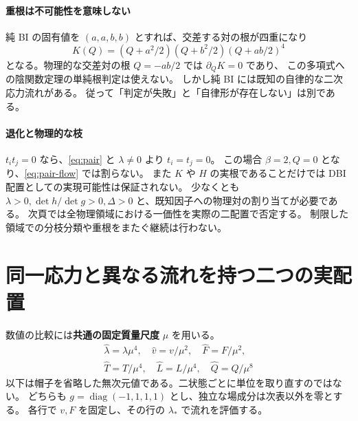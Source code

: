 \documentclass[11pt,a4paper]{article}
\begin{document}
\paragraph{重根は不可能性を意味しない}
純 BI の固有値を $(a,a,b,b)$ とすれば、交差する対の根が四重になり
\begin{equation}\label{eq:BI}
K(Q)=(Q+a^2/2)(Q+b^2/2)(Q+ab/2)^4
\end{equation}
となる。物理的な交差対の根 $Q=-ab/2$ では $\partial_QK=0$ であり、
この多項式への陰関数定理の単純根判定は使えない。
しかし純 BI には既知の自律的な二次応力流れがある。
従って「判定が失敗」と「自律形が存在しない」は別である。

\paragraph{退化と物理的な枝}
$t_it_j=0$ なら、\eqref{eq:pair} と $\lambda\ne0$ より $t_i=t_j=0$。
この場合 $\beta=2,Q=0$ となり、\eqref{eq:pair-flow} では割らない。
また $K$ や $H$ の実根であることだけでは DBI 配置としての実現可能性は保証されない。
少なくとも $\lambda>0,\det h/\det g>0,\Delta>0$ と、既知因子への物理対の割り当てが必要である。
次頁では全物理領域における一価性を実際の二配置で否定する。
制限した領域での分枝分類や重根をまたぐ継続は行わない。

\newpage
\section{同一応力と異なる流れを持つ二つの実配置}
数値の比較には\textbf{共通の固定質量尺度} $\mu$ を用いる。
\begin{equation}\label{eq:units}
\begin{gathered}
\widehat\lambda=\lambda\mu^4,\quad \widehat v=v/\mu^2,\quad \widehat F=F/\mu^2,\\
\widehat T=T/\mu^4,\quad \widehat L=L/\mu^4,\quad \widehat Q=Q/\mu^8
\end{gathered}
\end{equation}
以下は帽子を省略した無次元値である。二状態ごとに単位を取り直すのではない。
どちらも $g=\operatorname{diag}(-1,1,1,1)$ とし、独立な場成分は次表以外を零とする。
各行で $v,F$ を固定し、その行の $\lambda_*$ で流れを評価する。
\end{document}
